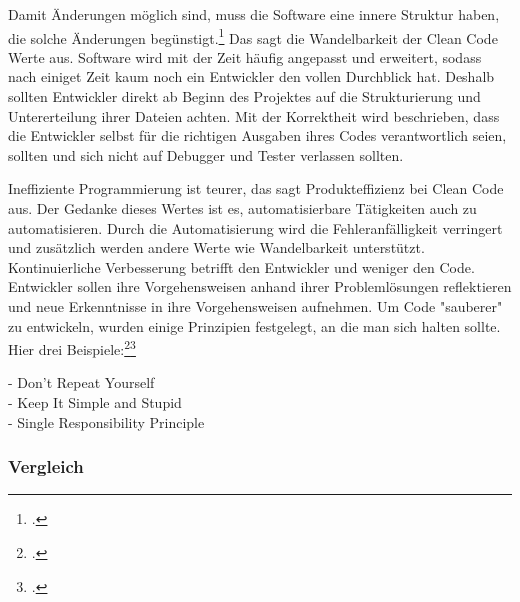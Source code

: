 \glqq Damit Änderungen möglich sind, muss die Software eine innere Struktur haben, die solche Änderungen begünstigt.\grqq\footcite{CleanCode}  Das sagt die Wandelbarkeit der Clean Code Werte aus. Software wird mit der Zeit häufig angepasst und erweitert, sodass nach einiget Zeit kaum noch ein Entwickler den vollen Durchblick hat. Deshalb sollten Entwickler direkt ab Beginn des Projektes auf die Strukturierung und Untererteilung ihrer Dateien achten.
Mit der Korrektheit wird beschrieben, dass die Entwickler selbst für die richtigen Ausgaben ihres Codes verantwortlich seien, sollten und sich nicht auf Debugger und Tester verlassen sollten.

Ineffiziente Programmierung ist teurer, das sagt Produkteffizienz bei Clean Code aus. Der Gedanke dieses Wertes ist es, automatisierbare Tätigkeiten auch zu automatisieren. Durch die Automatisierung wird die Fehleranfälligkeit verringert und zusätzlich werden andere Werte wie Wandelbarkeit unterstützt.
Kontinuierliche Verbesserung betrifft den Entwickler und weniger den Code. Entwickler sollen ihre Vorgehensweisen anhand ihrer Problemlösungen reflektieren und neue Erkenntnisse in ihre Vorgehensweisen aufnehmen. 
Um Code "sauberer" zu entwickeln, wurden einige Prinzipien festgelegt, an die man sich halten sollte. Hier drei Beispiele:\footcite[.vgl]{CleanCodeb}\footcite[.vgl]{CleanCodec}

-    Don't Repeat Yourself \\
-    Keep It Simple and Stupid \\
-    Single Responsibility Principle

\subsubsection*{Vergleich}

